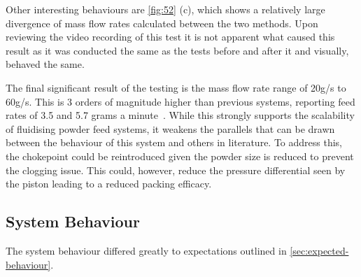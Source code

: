 Other interesting behaviours are \autoref{fig:52} (c), which shows a relatively large divergence of mass flow rates calculated between the two methods. Upon reviewing the video recording of this test it is not apparent what caused this result as it was conducted the same as the tests before and after it and visually, behaved the same.

The final significant result of the testing is the mass flow rate range of 20g/s to 60g/s. This is 3 orders of magnitude higher than previous systems, reporting feed rates of 3.5 and 5.7 grams a minute~\cite{BHATTIPROLU20181}. While this strongly supports the scalability of fluidising powder feed systems, it weakens the parallels that can be drawn between the behaviour of this system and others in literature. To address this, the chokepoint could be reintroduced given the powder size is reduced to prevent the clogging issue. This could, however, reduce the pressure differential seen by the piston leading to a reduced packing efficacy.

\subsection{System Behaviour}
The system behaviour differed greatly to expectations outlined in \autoref{sec:expected-behaviour}. 